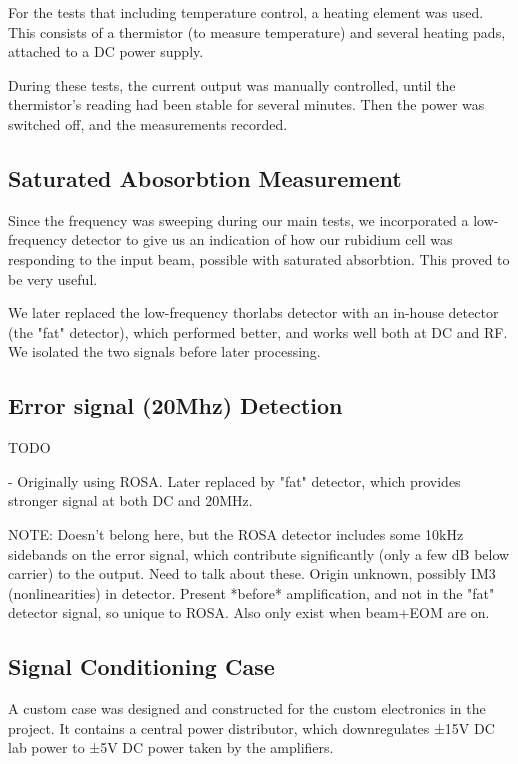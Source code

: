 For the tests that including temperature control, a heating element was used.  This consists of a thermistor (to measure temperature) and several heating pads, attached to a DC power supply.

During these tests, the current output was manually controlled, until the thermistor's reading had been stable for several minutes.  Then the power was switched off, and the measurements recorded.

\subsection{Saturated Abosorbtion Measurement}

Since the frequency was sweeping during our main tests, we incorporated a low-frequency detector to give us an indication of how our rubidium cell was responding to the input beam, possible with saturated absorbtion.  This proved to be very useful.

We later replaced the low-frequency thorlabs detector with an in-house detector (the "fat" detector), which performed better, and works well both at DC and RF.  We isolated the two signals before later processing.

\subsection{Error signal (20Mhz) Detection}

TODO

- Originally using ROSA.  Later replaced by "fat" detector, which provides stronger signal at both DC and 20MHz.

NOTE: Doesn't belong here, but the ROSA detector includes some 10kHz sidebands on the error signal, which contribute significantly (only a few dB below carrier) to the output.  Need to talk about these.  Origin unknown, possibly IM3 (nonlinearities) in detector.  Present *before* amplification, and not in the "fat" detector signal, so unique to ROSA.  Also only exist when beam+EOM are on.

\subsection{Signal Conditioning Case}

A custom case was designed and constructed for the custom electronics in the project.  It contains a central power distributor, which downregulates ±15V DC lab power to ±5V DC power taken by the amplifiers.

